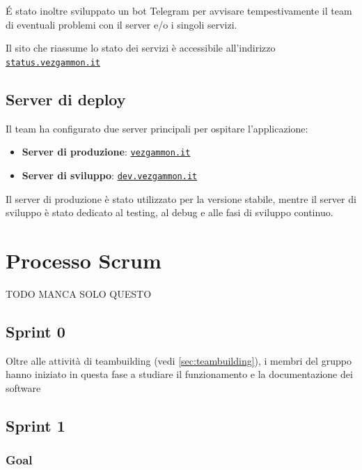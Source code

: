 \documentclass{article}
\begin{document}
\'E stato inoltre sviluppato un bot Telegram per avvisare tempestivamente il team di eventuali problemi con il server 
e/o i singoli servizi.

Il sito che riassume lo stato dei servizi è accessibile all'indirizzo \href{https://status.vezgammon.it}{\texttt{status.vezgammon.it}}

\subsection{Server di deploy}

Il team ha configurato due server principali per ospitare l'applicazione:
\begin{itemize}
    \item \textbf{Server di produzione}: \href{https://vezgammon.it}{\texttt{vezgammon.it}}
    \item \textbf{Server di sviluppo}: \href{https://dev.vezgammon.it}{\texttt{dev.vezgammon.it}}
\end{itemize}
Il server di produzione è stato utilizzato per la versione stabile, mentre il server di sviluppo è stato dedicato al testing, 
al debug e alle fasi di sviluppo continuo.


\section{Processo Scrum}
TODO MANCA SOLO QUESTO

\subsection{Sprint 0}
Oltre alle attività di teambuilding (vedi \ref{sec:teambuilding}), i membri del gruppo hanno iniziato in questa fase a studiare
il funzionamento e la documentazione dei software 

\subsection{Sprint 1}

\subsubsection{Goal}
\end{document}
